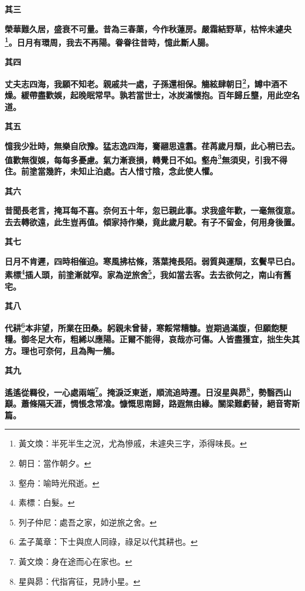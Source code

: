\begin{quoting}\textbf{其三}\end{quoting}

\textbf{榮華難久居，盛衰不可量。昔為三春蕖，今作秋蓮房。嚴霜結野草，枯悴未遽央\footnote{黃文煥：半死半生之況，尤為慘戚，未遽央三字，添得味長。}。日月有環周，我去不再陽。眷眷往昔時，憶此斷人腸。}

\begin{quoting}\textbf{其四}\end{quoting}

\textbf{丈夫志四海，我願不知老。親戚共一處，子孫還相保。觴絃肆朝日\footnote{朝日：當作朝夕。}，罇中酒不燥。緩帶盡歡娛，起晚眠常早。孰若當世士，冰炭滿懷抱。百年歸丘壟，用此空名道。}

\begin{quoting}\textbf{其五}\end{quoting}

\textbf{憶我少壯時，無樂自欣豫。猛志逸四海，騫翮思遠翥。荏苒歲月頹，此心稍已去。值歡無復娛，每每多憂慮。氣力漸衰損，轉覺日不如。壑舟\footnote{壑舟：喻時光飛逝。}無須臾，引我不得住。前塗當幾許，未知止泊處。古人惜寸陰，念此使人懼。}

\begin{quoting}\textbf{其六}\end{quoting}

\textbf{昔聞長老言，掩耳每不喜。奈何五十年，忽已親此事。求我盛年歡，一毫無復意。去去轉欲遠，此生豈再值。傾家持作樂，竟此歲月駛。有子不留金，何用身後置。}

\begin{quoting}\textbf{其七}\end{quoting}

\textbf{日月不肯遲，四時相催迫。寒風拂枯條，落葉掩長陌。弱質與運頹，玄鬢早已白。素標\footnote{素標：白髮。}插人頭，前塗漸就窄。家為逆旅舍\footnote{列子仲尼：處吾之家，如逆旅之舍。}，我如當去客。去去欲何之，南山有舊宅。}

\begin{quoting}\textbf{其八}\end{quoting}

\textbf{代耕\footnote{孟子萬章：下士與庶人同祿，祿足以代其耕也。}本非望，所業在田桑。躬親未曾替，寒餒常糟糠。豈期過滿腹，但願飽粳糧。御冬足大布，粗絺以應陽。正爾不能得，哀哉亦可傷。人皆盡獲宜，拙生失其方。理也可奈何，且為陶一觴。}

\begin{quoting}\textbf{其九}\end{quoting}

\textbf{遙遙從羇役，一心處兩端\footnote{黃文煥：身在途而心在家也。}。掩淚泛東逝，順流追時遷。日沒星與昴\footnote{星與昴：代指宵征，見詩小星。}，勢翳西山巔。蕭條隔天涯，惆悵念常飡。慷慨思南歸，路遐無由緣。關梁難虧替，絕音寄斯篇。}

